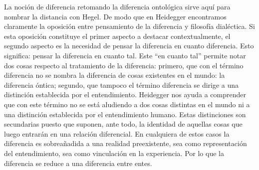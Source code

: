 La noción de diferencia retomando la diferencia ontológica sirve aquí
para nombrar la distancia con Hegel. De modo que en Heidegger
encontramos claramente la oposición entre pensamiento de la diferencia y
filosofía dialéctica. Si esta oposición constituye el primer aspecto a
destacar contextualmente, el segundo aspecto es la necesidad de pensar
la diferencia en cuanto diferencia. Esto significa: pensar la diferencia
en cuanto tal. Este \enquote{en cuanto tal} permite notar dos cosas respecto al
tratamiento de la diferencia: primero, que con el término diferencia no
se nombra la diferencia de cosas existentes en el mundo: la diferencia
óntica; segundo, que tampoco el término diferencia se dirige a una
distinción establecida por el entendimiento. Heidegger nos ayuda a
comprender que con este término no se está aludiendo a dos cosas
distintas en el mundo ni a una distinción establecida por el
entendimiento humano. Estas distinciones son secundarias puesto que
suponen, ante todo, la identidad de aquellas cosas que luego entrarán en
una relación diferencial. En cualquiera de estos casos la diferencia es
sobreañadida a una realidad preexistente, sea como representación del
entendimiento, sea como vinculación en la experiencia. Por lo que la
diferencia se reduce a una diferencia entre entes.

